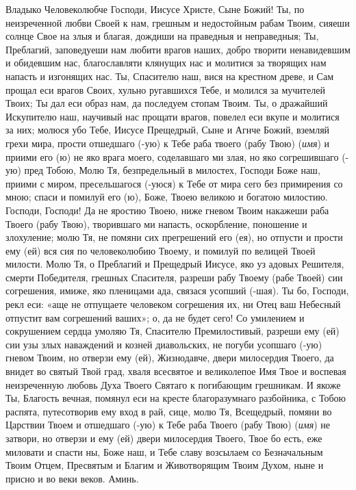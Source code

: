\begin{mymulticols}
 


Владыко Человеколюбче Господи, Иисусе Христе, Сыне Божий! Ты, по неизреченной любви Своей к нам, грешным и недостойным рабам Твоим, сияеши солнце Свое на злыя и благая, дождиши на праведныя и неправедныя; Ты, Преблагий, заповедуеши нам любити врагов наших, добро творити ненавидевшим и обидевшим нас, благославляти клянущих нас и молитися за творящих нам напасть и изгонящих нас. Ты, Спасителю наш, вися на крестном древе, и Сам прощал еси врагов Своих, хульно ругавшихся Тебе, и молился за мучителей Твоих; Ты дал еси образ нам, да последуем стопам Твоим. Ты, о дражайший Искупителю наш, научивый нас прощати врагов, повелел еси вкупе и молитися за них; молюся убо Тебе, Иисусе Прещедрый, Сыне и Агнче Божий, вземляй грехи мира, прости отшедшаго (-ую) к Тебе раба твоего (рабу Твою) ({\itshape имя}) и приими его (ю) не яко врага моего, соделавшаго ми злая, но яко согрешившаго (-ую) пред Тобою, Молю Тя, безпредельный в милостех, Господи Боже наш, приими с миром, пресельшагося (-уюся) к Тебе от мира сего без примирения со мною; спаси и помилуй его (ю), Боже, Твоею великою и богатою милостию. Господи, Господи! Да не яростию Твоею, ниже гневом Твоим накажеши раба Твоего (рабу Твою), творившаго ми напасть, оскорбление, поношение и злохуление; молю Тя, не помяни сих прегрешений его (ея), но отпусти и прости ему (ей) вся сия по человеколюбию Твоему, и помилуй по велицей Твоей милости. Молю Тя, о Преблагий и Прещедрый Иисусе, яко уз адовых Решителя, смерти Победителя, грешных Спасителя, разреши рабу Твоему (рабе Твоей) сии согрешения, имиже, яко пленицами ада, связася усопший (-шая). Ты бо, Господи, рекл еси: «аще не отпущаете человеком согрешения их, ни Отец ваш Небесный отпустит вам согрешений ваших»; о, да не будет сего! Со умилением и сокрушением сердца умоляю Тя, Спасителю Премилостивый, разреши ему (ей) сии узы злых наваждений и козней диавольских, не погуби усопшаго (-ую) гневом Твоим, но отверзи ему (ей), Жизнодавче, двери милосердия Твоего, да внидет во святый Твой град, хваля всесвятое и великолепое Имя Твое и воспевая неизреченную любовь Духа Твоего Святаго к погибающим грешникам. И якоже Ты, Благость вечная, помянул еси на кресте благоразумнаго разбойника, с Тобою распята, путесотворив ему вход в рай, сице, молю Тя, Всещедрый, помяни во Царствии Твоем и отшедшаго (-ую) к Тебе раба Твоего (рабу Твою) ({\itshape имя}) не затвори, но отверзи и ему (ей) двери милосердия Твоего, Твое бо есть, еже миловати и спасти ны, Боже наш, и Тебе славу возсылаем со Безначальным Твоим Отцем, Пресвятым и Благим и Животворящим Твоим Духом, ныне и присно и во веки веков. Аминь. 

\end{mymulticols}

